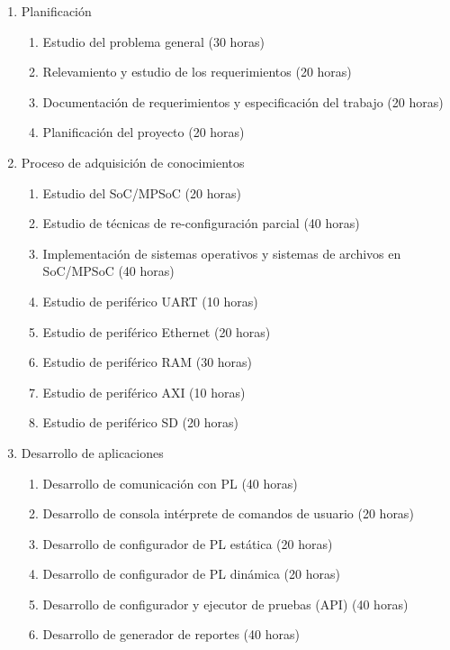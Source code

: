 \documentclass[
11pt, %
]{charter}
\begin{document}
\begin{enumerate}

	\item Planificación
	\begin{enumerate}
		\item Estudio del problema general (30 horas)
		\item Relevamiento y estudio de los requerimientos (20 horas)
		\item Documentación de requerimientos y especificación del trabajo (20 horas)
		\item Planificación del proyecto (20 horas)		
	\end{enumerate}
	
	\item Proceso de adquisición de conocimientos
	\begin{enumerate}
		\item Estudio del SoC/MPSoC (20 horas)
		\item Estudio de técnicas de re-configuración parcial (40 horas)
		\item Implementación de sistemas operativos y sistemas de archivos en SoC/MPSoC (40 horas)
		\item Estudio de periférico UART (10 horas)
		\item Estudio de periférico Ethernet (20 horas)
		\item Estudio de periférico RAM (30 horas)
		\item Estudio de periférico AXI (10 horas)
		\item Estudio de periférico SD (20 horas)
	\end{enumerate}
	
	\item Desarrollo de aplicaciones
	\begin{enumerate}
		\item Desarrollo de comunicación con PL (40 horas)
		\item Desarrollo de consola intérprete de comandos de usuario (20 horas)
		\item Desarrollo de configurador de PL estática (20 horas)
		\item Desarrollo de configurador de PL dinámica (20 horas)
		\item Desarrollo de configurador y ejecutor de pruebas (API) (40 horas)
		\item Desarrollo de generador de reportes (40 horas)
	\end{enumerate}
	

\end{enumerate}
\end{document}

